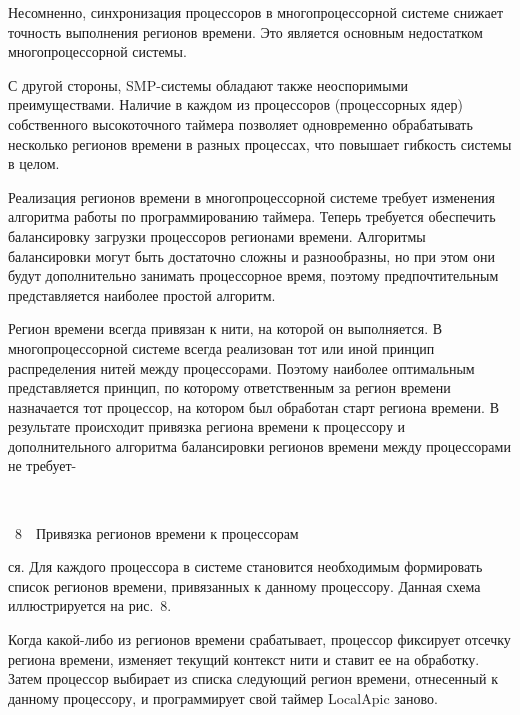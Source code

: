 \begin{multicols}{2}
   Несомненно, синхронизация процессоров в многопроцессорной системе снижает точность
выполнения регионов времени. Это является основным недостатком многопроцессорной системы.

   С другой стороны, SMP-системы обладают также неоспоримыми преимуществами. Наличие в
каждом из процессоров (процессорных ядер) собственного высокоточного таймера позволяет
одновременно обрабатывать несколько регионов времени в разных процессах, что повышает
гибкость системы в целом.

   Реализация регионов времени в мно\-го\-про\-цессорной системе требует изменения алгоритма
работы по программированию таймера. Теперь требуется обеспечить балансировку загрузки
процессоров регионами времени. Алгоритмы балансировки могут быть достаточно сложны и
разнообразны, но при этом они будут дополнительно занимать процессорное время, поэтому
предпочтительным представляется наиболее простой алгоритм.

   Регион времени всегда привязан к нити, на которой он выполняется. В многопроцессорной
системе всегда реализован тот или иной принцип распределения нитей между процессорами.
Поэтому наиболее оптимальным представляется принцип, по которому ответственным за регион
времени назначается тот процессор, на котором был обработан старт региона времени. В
результате происходит привязка региона времени к процессору и дополнительного алгоритма
балансировки регионов времени между процессорами не требует-\linebreak\vspace*{-12pt}
\pagebreak

\vspace*{1pt}
\begin{center}
\mbox{%
\epsfxsize=46.025mm
}
\end{center}
\vspace*{1pt}
{{\figurename~8}\ \ \small{Привязка регионов времени к процессорам}}
\bigskip
\addtocounter{figure}{1}  




\noindent
ся. Для каждого процессора в
системе становится необходимым формировать список регионов времени, привязанных к данному
процессору. Данная схема иллюстрируется на рис.~8.



   Когда какой-либо из регионов времени срабатывает, процессор фиксирует отсечку региона
времени, изменяет текущий контекст нити и ставит ее на обработку. Затем процессор выбирает из
списка следующий регион времени, отнесенный к данному процессору, и программирует свой
таймер LocalApic заново.


\end{multicols}
